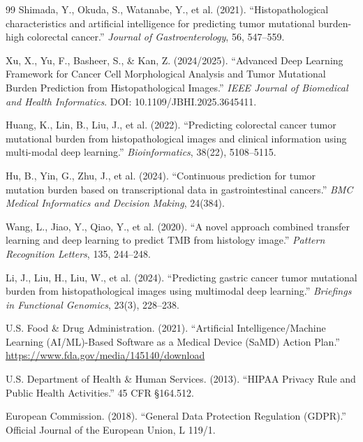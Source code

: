\documentclass[11pt,a4paper]{article}
\begin{document}
\begin{thebibliography}{99}
Shimada, Y., Okuda, S., Watanabe, Y., et al. (2021).
``Histopathological characteristics and artificial intelligence for predicting tumor mutational burden-high colorectal cancer.''
\textit{Journal of Gastroenterology}, 56, 547--559.

Xu, X., Yu, F., Basheer, S., \& Kan, Z. (2024/2025).
``Advanced Deep Learning Framework for Cancer Cell Morphological Analysis and Tumor Mutational Burden Prediction from Histopathological Images.''
\textit{IEEE Journal of Biomedical and Health Informatics}.
DOI: 10.1109/JBHI.2025.3645411.

Huang, K., Lin, B., Liu, J., et al. (2022).
``Predicting colorectal cancer tumor mutational burden from histopathological images and clinical information using multi-modal deep learning.''
\textit{Bioinformatics}, 38(22), 5108--5115.

Hu, B., Yin, G., Zhu, J., et al. (2024).
``Continuous prediction for tumor mutation burden based on transcriptional data in gastrointestinal cancers.''
\textit{BMC Medical Informatics and Decision Making}, 24(384).

Wang, L., Jiao, Y., Qiao, Y., et al. (2020).
``A novel approach combined transfer learning and deep learning to predict TMB from histology image.''
\textit{Pattern Recognition Letters}, 135, 244--248.

Li, J., Liu, H., Liu, W., et al. (2024).
``Predicting gastric cancer tumor mutational burden from histopathological images using multimodal deep learning.''
\textit{Briefings in Functional Genomics}, 23(3), 228--238.

U.S. Food \& Drug Administration. (2021).
``Artificial Intelligence/Machine Learning (AI/ML)-Based Software as a Medical Device (SaMD) Action Plan.''
\url{https://www.fda.gov/media/145140/download}

U.S. Department of Health \& Human Services. (2013).
``HIPAA Privacy Rule and Public Health Activities.'' 45 CFR \S 164.512.

European Commission. (2018).
``General Data Protection Regulation (GDPR).'' Official Journal of the European Union, L 119/1.
\end{thebibliography}
\end{document}
